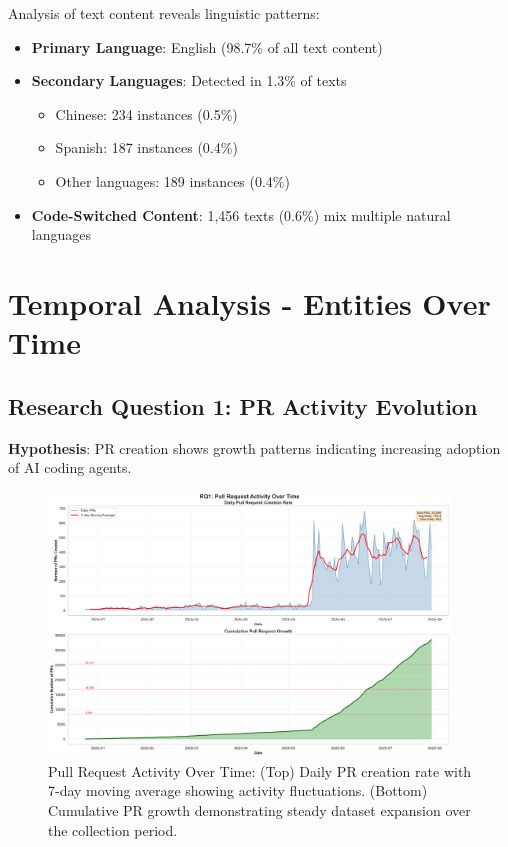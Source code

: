 \documentclass[11pt]{article}
\begin{document}
Analysis of text content reveals linguistic patterns:
\begin{itemize}
    \item \textbf{Primary Language}: English (98.7\% of all text content)
    \item \textbf{Secondary Languages}: Detected in 1.3\% of texts
    \begin{itemize}
        \item Chinese: 234 instances (0.5\%)
        \item Spanish: 187 instances (0.4\%)
        \item Other languages: 189 instances (0.4\%)
    \end{itemize}
    \item \textbf{Code-Switched Content}: 1,456 texts (0.6\%) mix multiple natural languages
\end{itemize}

\section{Temporal Analysis - Entities Over Time}

\subsection{Research Question 1: PR Activity Evolution}

\textbf{Hypothesis}: PR creation shows growth patterns indicating increasing adoption of AI coding agents.

\begin{figure}[H]
\centering
\includegraphics[width=0.95\textwidth]{figures/temporal_01_pr_growth.png}
\caption{Pull Request Activity Over Time: (Top) Daily PR creation rate with 7-day moving average showing activity fluctuations. (Bottom) Cumulative PR growth demonstrating steady dataset expansion over the collection period.}
\label{fig:temporal_pr}
\end{figure}
\end{document}
